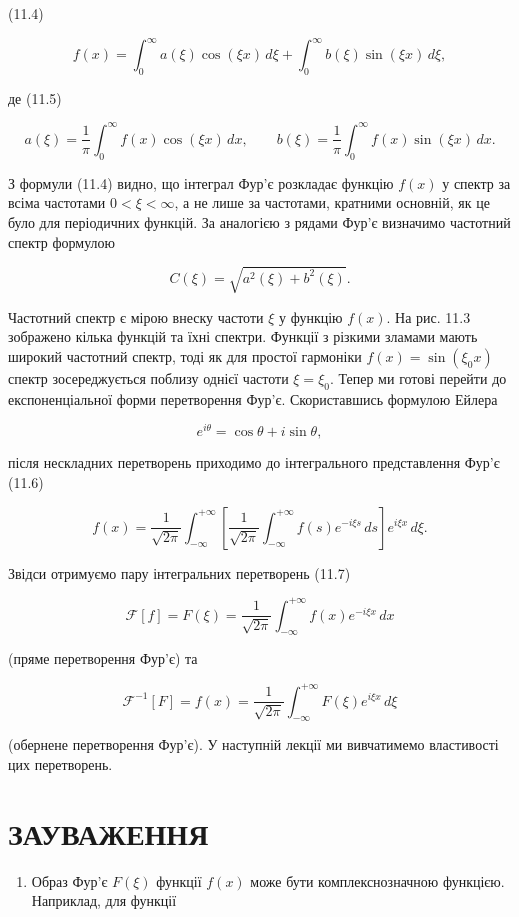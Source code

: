 \documentclass[
  ukrainian,
]{article}
\providecommand{\tightlist}{%
  \setlength{\itemsep}{0pt}\setlength{\parskip}{0pt}}
\begin{document}
(11.4)

\[
f(x) = \int_{0}^{\infty} a(\xi)\cos(\xi x)\,d\xi + \int_{0}^{\infty} b(\xi)\sin(\xi x)\,d\xi,
\]

де (11.5)

\[
a(\xi) = \frac{1}{\pi}\int_{0}^{\infty} f(x)\cos(\xi x)\,dx, \qquad b(\xi) = \frac{1}{\pi}\int_{0}^{\infty} f(x)\sin(\xi x)\,dx.
\]

З формули (11.4) видно, що інтеграл Фур'є розкладає функцію \(f(x)\) у
спектр за всіма частотами \(0<\xi<\infty\), а не лише за частотами,
кратними основній, як це було для періодичних функцій. За аналогією з
рядами Фур'є визначимо частотний спектр формулою

\[
C(\xi) = \sqrt{a^2(\xi) + b^2(\xi)}.
\]

Частотний спектр є мірою внеску частоти \(\xi\) у функцію \(f(x)\). На
рис. 11.3 зображено кілька функцій та їхні спектри. Функції з різкими
зламами мають широкий частотний спектр, тоді як для простої гармоніки
\(f(x)=\sin(\xi_0 x)\) спектр зосереджується поблизу однієї частоти
\(\xi=\xi_0\). Тепер ми готові перейти до експоненціальної форми
перетворення Фур'є. Скориставшись формулою Ейлера

\[
e^{i\theta} = \cos\theta + i\sin\theta,
\]

після нескладних перетворень приходимо до інтегрального представлення
Фур'є (11.6)

\[
f(x) = \frac{1}{\sqrt{2\pi}} \int_{-\infty}^{+\infty}
\left[\frac{1}{\sqrt{2\pi}} \int_{-\infty}^{+\infty} f(s)e^{-i\xi s}\,ds \right]
e^{i\xi x}\,d\xi.
\]

Звідси отримуємо пару інтегральних перетворень (11.7)

\[
\mathcal{F}[f] = F(\xi) = \frac{1}{\sqrt{2\pi}} \int_{-\infty}^{+\infty} f(x)e^{-i\xi x}\,dx
\]

(пряме перетворення Фур'є) та

\[
\mathcal{F}^{-1}[F] = f(x) = \frac{1}{\sqrt{2\pi}} \int_{-\infty}^{+\infty} F(\xi)e^{i\xi x}\,d\xi
\]

(обернене перетворення Фур'є). У наступній лекції ми вивчатимемо
властивості цих перетворень.

\section{ЗАУВАЖЕННЯ}\label{ux437ux430ux443ux432ux430ux436ux435ux43dux43dux44f-7}

\begin{enumerate}
\def\labelenumi{\arabic{enumi}.}
\tightlist
\item
  Образ Фур'є \(F(\xi)\) функції \(f(x)\) може бути комплекснозначною
  функцією. Наприклад, для функції
\end{enumerate}
\end{document}
